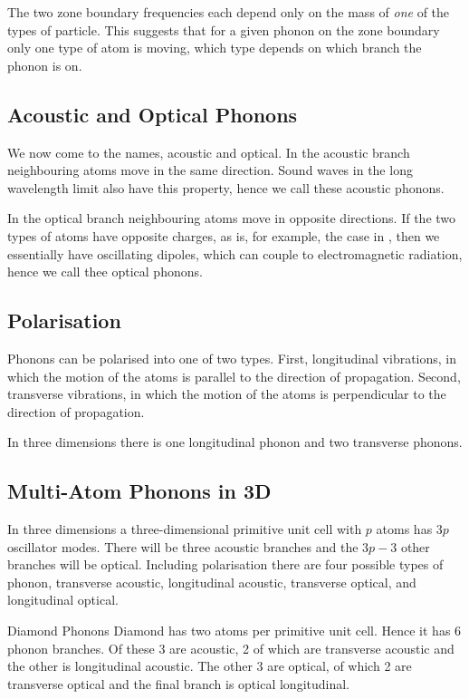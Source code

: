 \documentclass[fleqn]{NotesClass}
\begin{document}
    The two zone boundary frequencies each depend only on the mass of \emph{one} of the types of particle.
    This suggests that for a given phonon on the zone boundary only one type of atom is moving, which type depends on which branch the phonon is on.
    
    \subsection{Acoustic and Optical Phonons}
    We now come to the names, acoustic and optical.
    In the acoustic branch neighbouring atoms move in the same direction.
    Sound waves in the long wavelength limit also have this property, hence we call these acoustic phonons.
    
    In the optical branch neighbouring atoms move in opposite directions.
    If the two types of atoms have opposite charges, as is, for example, the case in , then we essentially have oscillating dipoles, which can couple to electromagnetic radiation, hence we call thee optical phonons.
    
    \subsection{Polarisation}
    Phonons can be polarised into one of two types.
    First, longitudinal vibrations, in which the motion of the atoms is parallel to the direction of propagation.
    Second, transverse vibrations, in which the motion of the atoms is perpendicular to the direction of propagation.

    In three dimensions there is one longitudinal phonon and two transverse phonons.
    
    \subsection{Multi-Atom Phonons in 3D}
    In three dimensions a three-dimensional primitive unit cell with \(p\) atoms has \(3p\) oscillator modes.
    There will be three acoustic branches and the \(3p - 3\) other branches will be optical.
    Including polarisation there are four possible types of phonon, transverse acoustic, longitudinal acoustic, transverse optical, and longitudinal optical.
    
    \begin{exm}{Diamond Phonons}{}
        Diamond has two atoms per primitive unit cell.
        Hence it has 6 phonon branches.
        Of these 3 are acoustic, 2 of which are transverse acoustic and the other is longitudinal acoustic.
        The other 3 are optical, of which 2 are transverse optical and the final branch is optical longitudinal.
    \end{exm}
\end{document}

